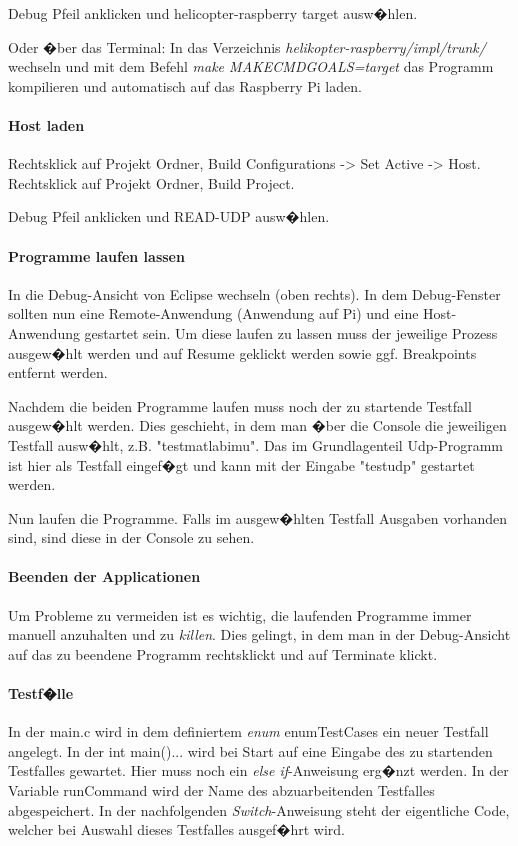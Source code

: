 Debug Pfeil anklicken und helicopter-raspberry target ausw�hlen.

Oder �ber das Terminal: In das Verzeichnis \emph{helikopter-raspberry/impl/trunk/} wechseln
und mit dem Befehl \newline
\emph{make MAKECMDGOALS=target}\newline
das Programm  kompilieren und automatisch auf das Raspberry Pi laden.

\paragraph{Host laden}
Rechtsklick auf Projekt Ordner, 
Build Configurations -> Set Active -> Host.
Rechtsklick auf Projekt Ordner, Build Project.

Debug Pfeil anklicken und READ-UDP ausw�hlen.

\paragraph{Programme laufen lassen}
In die Debug-Ansicht von Eclipse wechseln (oben rechts). In dem Debug-Fenster sollten nun eine Remote-Anwendung (Anwendung auf Pi) und eine Host-Anwendung gestartet sein. Um diese laufen zu lassen muss der jeweilige Prozess ausgew�hlt werden und auf Resume geklickt werden sowie ggf. Breakpoints entfernt werden.

Nachdem die beiden Programme laufen muss noch der zu startende Testfall ausgew�hlt werden. Dies geschieht, in dem man �ber die Console die jeweiligen Testfall ausw�hlt, z.B. "testmatlabimu". Das im Grundlagenteil Udp-Programm ist hier als Testfall eingef�gt und kann mit der Eingabe "testudp" gestartet werden.

Nun laufen die Programme. Falls im ausgew�hlten Testfall Ausgaben vorhanden sind, sind diese in der Console zu sehen.

\paragraph{Beenden der Applicationen}
Um Probleme zu vermeiden ist es wichtig, die laufenden Programme immer manuell anzuhalten und zu \emph{killen}. Dies gelingt, in dem man in der Debug-Ansicht auf das zu beendene Programm rechtsklickt und auf Terminate klickt. 

\paragraph{Testf�lle}
In der main.c wird in dem definiertem \emph{enum} enumTestCases ein neuer Testfall angelegt.
In der int main(){...} wird bei Start auf eine Eingabe des zu startenden Testfalles gewartet. Hier muss noch ein \emph{else if}-Anweisung erg�nzt werden. 
In der Variable runCommand wird der Name des abzuarbeitenden Testfalles abgespeichert.
In der nachfolgenden \emph{Switch}-Anweisung steht der eigentliche Code, welcher bei Auswahl dieses Testfalles ausgef�hrt wird.


